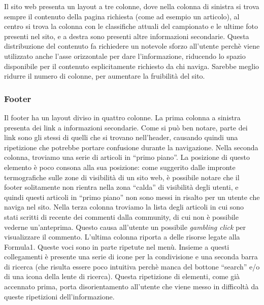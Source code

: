 Il sito web presenta un layout a tre colonne, dove nella colonna di sinistra si
trova sempre il contenuto della pagina richiesta (come ad esempio un articolo),
al centro si trova la colonna con le classifiche attuali del campionato e le
ultime foto presenti nel sito, e a destra sono presenti altre informazioni
secondarie. Questa distribuzione del contenuto fa richiedere un notevole sforzo
all'utente perch\`e viene utilizzato anche l'asse orizzontale per dare
l'informazione, riducendo lo spazio disponibile per il contenuto esplicitamente
richiesto da chi naviga. Sarebbe meglio ridurre il numero di colonne, per
aumentare la fruibilit\`a del sito.

\subsubsection{Footer}

Il footer ha un layout diviso in quattro colonne. La prima colonna a sinistra
presenta dei link a informazioni secondarie. Come si può ben notare, parte dei
link sono gli stessi di quelli che si trovano nell'header, causando quindi una
ripetizione che potrebbe portare confusione durante la navigazione.
Nella seconda colonna, troviamo una serie di articoli in ``primo piano''. La
posizione di questo elemento è poco consona alla sua posizione: come suggerito
dalle impronte termografiche sulle zone di visibilità di un
sito web, è possibile notare che il footer solitamente non rientra nella zona
``calda'' di visibilità degli utenti, e quindi questi articoli in ``primo piano''
non sono messi in risalto per un utente che naviga nel sito.
Nella terza colonna troviamo la lista degli articoli in cui sono stati scritti
di recente dei commenti dalla community, di cui non è possibile vederne
un'anteprima. Questo causa all'utente un possibile \textit{gambling click}
per visualizzare il commento.
L'ultima colonna riporta a delle risorse legate alla Formula1. Queste voci sono
in parte ripetute nel menù. Insieme a questi collegamenti è presente una serie
di icone per la condivisione e una seconda barra di ricerca (che risulta essere
poco intuitiva perchè manca del bottone ``search'' e/o di una icona della lente
di ricerca). Questa ripetizione di elementi, come già accennato prima, porta
disorientamento all'utente che viene messo in difficoltà da queste ripetizioni
dell'informazione.

